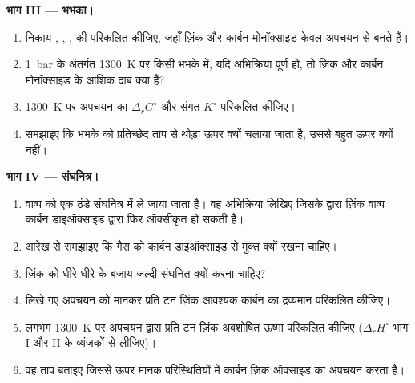 \begin{problem}
\medskip
\noindent\textbf{भाग III --- भभका।}
\begin{enumerate}[resume]
  \item निकाय , , ,
         की  परिकलित कीजिए, जहाँ ज़िंक और कार्बन मोनॉक्साइड केवल अपचयन से बनते हैं।
  \item \qty{1}{bar} के अंतर्गत \qty{1300}{K} पर किसी भभके में, यदि अभिक्रिया पूर्ण हो, तो ज़िंक और कार्बन
        मोनॉक्साइड के आंशिक दाब क्या हैं?
  \item \qty{1300}{K} पर अपचयन का $\Delta_r G^\circ$ और
        संगत $K^\circ$ परिकलित कीजिए।
  \item समझाइए कि भभके को प्रतिच्छेद ताप से थोड़ा ऊपर क्यों चलाया जाता है,
        उससे बहुत ऊपर क्यों नहीं।
\end{enumerate}

\medskip
\noindent\textbf{भाग IV --- संघनित्र।}
\begin{enumerate}[resume]
  \item वाष्प को एक ठंडे संघनित्र में ले जाया जाता है। वह अभिक्रिया लिखिए जिसके द्वारा
        ज़िंक वाष्प कार्बन डाइऑक्साइड द्वारा फिर ऑक्सीकृत हो सकती है।
  \item आरेख से समझाइए कि गैस को कार्बन
        डाइऑक्साइड से मुक्त क्यों रखना चाहिए।
  \item ज़िंक को धीरे-धीरे के बजाय जल्दी संघनित क्यों करना चाहिए?
  \item लिखे गए अपचयन को मानकर प्रति टन ज़िंक आवश्यक कार्बन का द्रव्यमान
        परिकलित कीजिए।
  \item लगभग \qty{1300}{K} पर अपचयन द्वारा प्रति टन ज़िंक अवशोषित ऊष्मा परिकलित कीजिए
        ($\Delta_r H^\circ$ भाग I
        और II के व्यंजकों से लीजिए)।
  \item वह ताप बताइए जिससे ऊपर मानक परिस्थितियों में कार्बन ज़िंक ऑक्साइड का अपचयन
        करता है।
\end{enumerate}
\end{problem}
